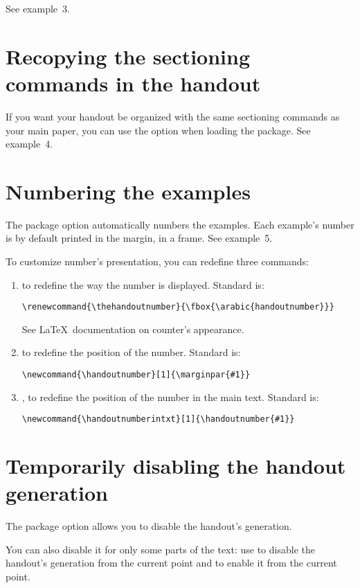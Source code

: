\documentclass{ltxdockit}[2011/03/25]
\begin{document}
See example~3.

\section{Recopying the sectioning commands in the handout}

If you want your handout be organized with the same sectioning commands as your main paper, you can use the option  when loading the package. See example~4.

\section{Numbering the examples}

The package option  automatically numbers the examples. Each example's number is by default printed in the margin, in a frame. See example~5.

To customize number's presentation, you can redefine three commands:
\begin{enumerate}  
  \item {} to redefine the way the number is displayed. Standard is:
\begin{verbatim}
\renewcommand{\thehandoutnumber}{\fbox{\arabic{handoutnumber}}}
\end{verbatim}  
See \LaTeX\ documentation on counter's appearance. 
  \item {} to redefine the position of the number. Standard is:
\begin{verbatim}
\newcommand{\handoutnumber}[1]{\marginpar{#1}}
\end{verbatim}
  \item {}, to redefine the position of the number in the main text. Standard is:
\begin{verbatim}
\newcommand{\handoutnumberintxt}[1]{\handoutnumber{#1}}
\end{verbatim}
\end{enumerate}

\section{Temporarily disabling the handout generation}

The package option  allows you to disable the handout's generation.

\label{enablehandout}You can also disable it for only some parts of the text: use  to disable the handout's generation from the current point and  to enable it from the current point.
\end{document}
